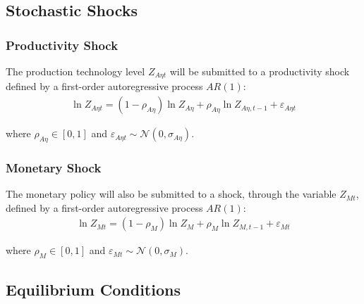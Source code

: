 \documentclass[
	thesis.tex
	]{subfiles}
\begin{document}

\subsection{Stochastic Shocks}\label{sec:stochastic-shocks}

\subsubsection*{Productivity Shock} \label{sec:productivity shock}

The production technology level $Z_{A\eta t}$ will be submitted to a productivity shock defined by a first-order autoregressive process $AR(1)$:
\begin{align}
	\ln{Z_{A\eta t}} = (1-\rho_{A\eta})\ln{Z_{A\eta}} + \rho_{A\eta}\ln{Z_{A\eta,t-1}} + \varepsilon_{A\eta t} \label{eq:reg-productivity-shock}
\end{align}

where $\rho_{A\eta} \in [0,1]$ and $\varepsilon_{A\eta t} \sim \mathscr{N}(0,\sigma_{A\eta})$.

\subsubsection*{Monetary Shock} \label{sec:monetary shock}

The monetary policy will also be submitted to a shock, through the variable $Z_{Mt}$, defined by a first-order autoregressive process $AR(1)$:
\begin{align}
	\ln{Z_{Mt}} = (1-\rho_M)\ln{Z_{M}} + \rho_M\ln{Z_{M,t-1}} + \varepsilon_{Mt} \label{eq:reg-monetary-shock}
\end{align}

where $\rho_M \in [0,1]$ and $\varepsilon_{Mt} \sim \mathscr{N}(0,\sigma_M)$.


\subsection{Equilibrium Conditions}

\end{document}
